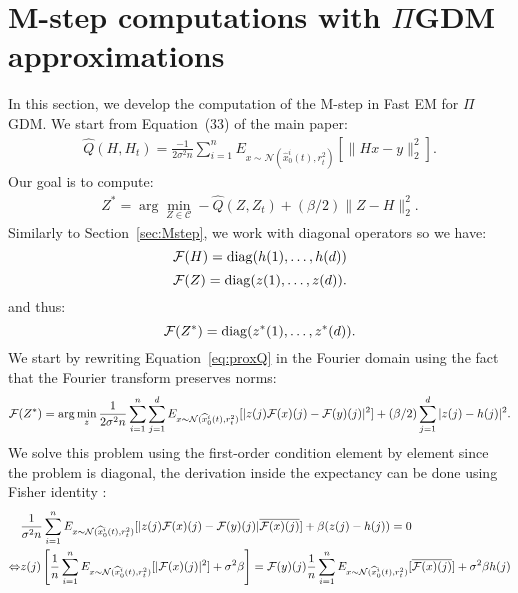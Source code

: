 \section{M-step computations with $\Pi$GDM approximations}\label{sec:Mstep-pigdm}
%
In this section, we develop the computation of the M-step in Fast EM for $\Pi$GDM. We start from Equation~(33) of the main paper:
\begin{align}\label{eq:proxQ}
    \widehat{Q}(H, H_t) = \frac{-1}{2\sigma^2 n}\sum_{i=1}^n{ E_{x \sim \mathcal{N}( \widehat{x}_0^i(t), r_t^2)}[\|Hx-y\|_2^2]}.
\end{align}
Our goal is to compute:
\begin{align}
    Z^* = \arg\min_{Z \in \mathcal{C}} -\widehat{Q}(Z, Z_t) + (\beta/2)\|Z-H\|_2^2.
\end{align}
Similarly to Section~\ref{sec:Mstep}, we work with diagonal operators so we have:
\begin{equation}
{\mathcal{F}(H)} = \operatorname{diag}(h(1),\dots,h(d))
\end{equation}
%
\begin{equation}
{\mathcal{F}(Z)} = \operatorname{diag}(z(1),\dots,z(d)).
\end{equation}
and thus: 
\begin{equation}
{\mathcal{F}(Z^*)} = \operatorname{diag}(z^*(1),\dots,z^*(d)).
\end{equation}
We start by rewriting Equation~\ref{eq:proxQ} in the Fourier domain using the fact that the Fourier transform preserves norms:
\begin{align}
    {\mathcal{F}(Z^*)} = \arg\min_z  \frac{1}{2\sigma^2 n}\sum_{i=1}^n{\sum_{j=1}^d{ E_{x \sim \mathcal{N}(\widehat{x}_0^i(t), r_t^2)}[|z(j){\mathcal{F}(x)}(j)-{\mathcal{F}(y)}(j)|^2]}} + (\beta/2)\sum_{j=1}^d{|z(j)-h(j)|^2}.
\end{align}
We solve this problem using the first-order condition element by element since the problem is diagonal, the derivation inside the expectancy can be done using Fisher identity \cite[Proposition D.4]{Douc2014}:
\begin{align}
     & \frac{1}{\sigma^2 n}\sum_{i=1}^n{ E_{x \sim \mathcal{N}( \widehat{x}_0^i(t), r_t^2)}[|z(j){\mathcal{F}(x)}(j)-{\mathcal{F}(y)}(j)|\overline{{\mathcal{F}(x)}(j)}]} + \beta(z(j)-h(j)) = 0 \\
     \Leftrightarrow & z(j)\left[ \frac{1}{n}\sum_{i=1}^n{E_{x \sim \mathcal{N}( \widehat{x}_0^i(t), r_t^2)}[|{\mathcal{F}(x)}(j)|^2]} + \sigma^2\beta \right] = {\mathcal{F}(y)}(j) \frac{1}{n}\sum_{i=1}^n{E_{x \sim \mathcal{N}( \widehat{x}_0^i(t), r_t^2)}[\overline{{\mathcal{F}(x)}(j)}]} + \sigma^2\beta h(j)
\end{align}
